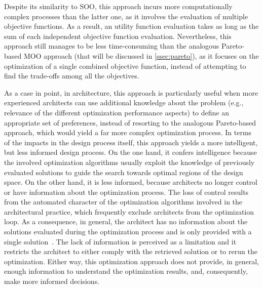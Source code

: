 	Despite its similarity to \ac{SOO}, this approach incurs more computationally complex processes than the latter one, as it involves the evaluation of multiple objective functions. As a result, an utility function evaluation takes as long as the sum of each independent objective function evaluation. Nevertheless, this approach still manages to be less time-consuming than the analogous Pareto-based \ac{MOO} approach (that will be discussed in \cref{ssec:pareto}), as it focuses on the optimization of a single combined objective function, instead of attempting to find the trade-offs among all the objectives. 
	
	As a case in point, in architecture, this approach is particularly useful when more experienced architects can use additional knowledge about the problem (e.g., relevance of the different optimization performance aspects) to define an appropriate set of preferences, instead of resorting to the analogous Pareto-based approach, which would yield a far more complex optimization process. In terms of the impacts in the design process itself, this approach yields a more intelligent, but less informed design process. On the one hand, it confers intelligence because the involved optimization algorithms usually exploit the knowledge of previously evaluated solutions to guide the search towards optimal regions of the design space. On the other hand, it is less informed, because architects no longer control or have information about the optimization process. The loss of control results from the automated character of the optimization algorithms involved in the architectural practice, which frequently exclude architects from the optimization loop. As a consequence, in general, the architect has no information about the solutions evaluated during the optimization process and is only provided with a single solution~\cite{Custodio2010}. The lack of information is perceived as a limitation \cite{Cichocka2017SURVEY} and it restricts the architect to either comply with the retrieved solution or to rerun the optimization. Either way, this optimization approach does not provide, in general, enough information to understand the optimization results, and, consequently, make more informed decisions. 
	
